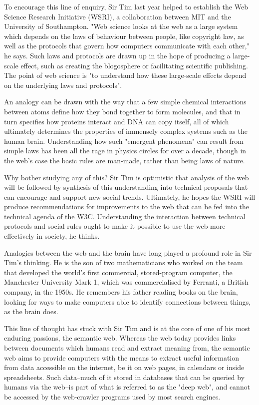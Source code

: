 To encourage this line of enquiry, Sir Tim last year helped to establish the Web Science Research Initiative (WSRI), a collaboration between MIT and the University of Southampton. "Web science looks at the web as a large system which depends on the laws of behaviour between people, like copyright law, as well as the protocols that govern how computers communicate with each other," he says. Such laws and protocols are drawn up in the hope of producing a large-scale effect, such as creating the blogosphere or facilitating scientific publishing. The point of web science is "to understand how these large-scale effects depend on the underlying laws and protocols".

An analogy can be drawn with the way that a few simple chemical interactions between atoms define how they bond together to form molecules, and that in turn specifies how proteins interact and DNA can copy itself, all of which ultimately determines the properties of immensely complex systems such as the human brain. Understanding how such "emergent phenomena" can result from simple laws has been all the rage in physics circles for over a decade, though in the web's case the basic rules are man-made, rather than being laws of nature.

Why bother studying any of this? Sir Tim is optimistic that analysis of the web will be followed by synthesis of this understanding into technical proposals that can encourage and support new social trends. Ultimately, he hopes the WSRI will produce recommendations for improvements to the web that can be fed into the technical agenda of the W3C. Understanding the interaction between technical protocols and social rules ought to make it possible to use the web more effectively in society, he thinks. 

Analogies between the web and the brain have long played a profound role in Sir Tim's thinking. He is the son of two mathematicians who worked on the team that developed the world's first commercial, stored-program computer, the Manchester University Mark 1, which was commercialised by Ferranti, a British company, in the 1950s. He remembers his father reading books on the brain, looking for ways to make computers able to identify connections between things, as the brain does. 

This line of thought has stuck with Sir Tim and is at the core of one of his most enduring passions, the semantic web. Whereas the web today provides links between documents which humans read and extract meaning from, the semantic web aims to provide computers with the means to extract useful information from data accessible on the internet, be it on web pages, in calendars or inside spreadsheets. Such data--much of it stored in databases that can be queried by humans via the web--is part of what is referred to as the "deep web", and cannot be accessed by the web-crawler programs used by most search engines.

